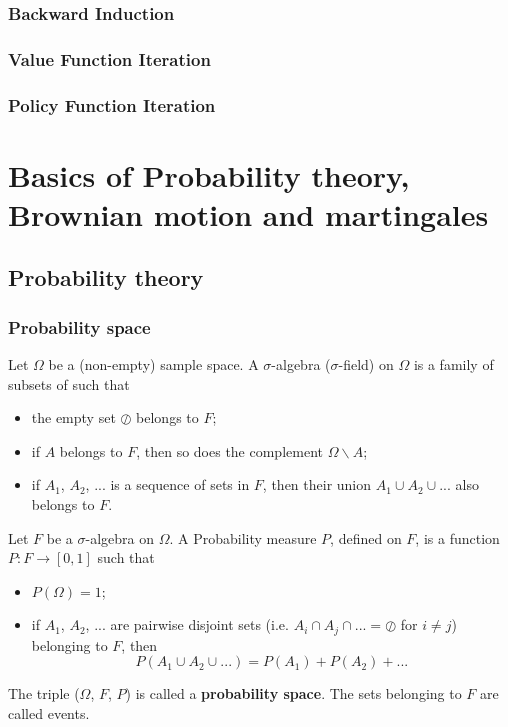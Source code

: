 \documentclass[11pt,a4paper]{book}
\theoremstyle{definition}\newtheorem{definition}{Definition}
\theoremstyle{definition}\newtheorem{fact}{Fact}
\theoremstyle{definition}\newtheorem{remark}{Remark}
\theoremstyle{definition}\newtheorem{ex}{Ex.}
\theoremstyle{definition}\newtheorem{project}{Project}
\theoremstyle{definition}\newtheorem{problem}{Problem}
\theoremstyle{definition}\newtheorem{example}{Example}
\numberwithin{theorem}{section}
\numberwithin{corollary}{chapter}
\numberwithin{assumption}{chapter}
\numberwithin{definition}{chapter}
\numberwithin{prop}{chapter}
\numberwithin{notation}{chapter}
\numberwithin{problem}{chapter}
\numberwithin{example}{chapter}
\numberwithin{fact}{chapter}
\numberwithin{ex}{chapter}
\begin{document}
	\subsection{Backward Induction}
	\subsection{Value Function Iteration}
	\subsection{Policy Function Iteration}
	
		
\chapter{Basics of Probability theory, Brownian motion and martingales}

\section{Probability theory}

\subsection{Probability space}
Let $\Omega$ be a (non-empty) sample space. A $\sigma$-algebra ($\sigma$-field) on $\Omega$ is a family of subsets of such that
\begin{itemize}
\item the empty set $\oslash$ belongs to $F$;
\item if $A$ belongs to $F$, then so does the complement $\Omega \backslash A$;
\item if $A_1$, $A_2$, ... is a sequence of sets in $F$, then their union $A_1 \cup A_2 \cup ...$ also belongs to $F$.
\end{itemize}

Let $F$ be a $\sigma$-algebra on $\Omega$. A Probability measure $P$, defined on $F$, is a function $P : F \rightarrow [0,1]$ such that
\begin{itemize}
\item $P(\Omega) = 1$;
\item if $A_1$, $A_2$, ... are pairwise disjoint sets (i.e. $A_i \cap A_j \cap ... = \oslash$ for $i \neq j$) belonging to $F$, then
$$P(A_1 \cup A_2 \cup ...)  = P(A_1) + P(A_2) + ...$$
\end{itemize}

The triple ($\Omega$, $F$, $P$) is called a \textbf{probability space}. The sets belonging to $F$ are called events.
\end{document}
